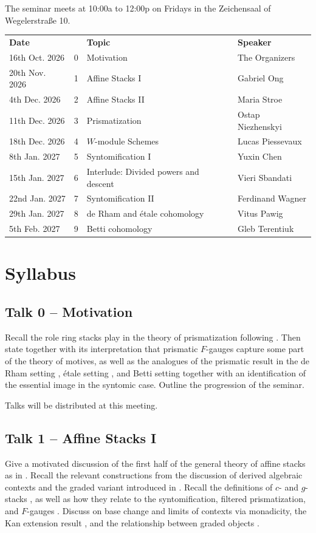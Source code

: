 \documentclass[12pt]{amsart}
\theoremstyle{definition}
\begin{document}
The seminar meets at 10:00a to 12:00p on Fridays in the Zeichensaal of Wegelerstraße 10.  
\begin{table}[H]
    \centering
    \begin{tabular}{lrll}
        \textbf{Date}  & & \textbf{Topic} & \textbf{Speaker}\\
        16th Oct. 2026 &0& Motivation &  The Organizers\\
        20th Nov. 2026 &1& Affine Stacks I &  Gabriel Ong\\
        4th Dec. 2026 &2& Affine Stacks II &  Maria Stroe\\
        11th Dec. 2026 &3& Prismatization &  Ostap Niezhenskyi\\
        18th Dec. 2026 &4& $W$-module Schemes &  Lucas Piessevaux\\
        8th Jan. 2027 &5& Syntomification I &  Yuxin Chen\\
        15th Jan. 2027 &6& Interlude: Divided powers and descent &  Vieri Sbandati\\
        22nd Jan. 2027 &7& Syntomification II &  Ferdinand Wagner\\
        29th Jan. 2027 &8& de Rham and \'{e}tale cohomology &  Vitus Pawig\\
        5th Feb. 2027 &9& Betti cohomology & Gleb Terentiuk
    \end{tabular}
\end{table}
\section*{Syllabus}
\subsection*{Talk 0 -- Motivation}
Recall the role ring stacks play in the theory of prismatization following \cite[\S 1.4]{Bha22}. Then state \cite[Thm. 1.7.4]{LM25} together with its interpretation that prismatic $F$-gauges capture some part of the theory of motives, as well as the analogues of the prismatic result in the de Rham setting \cite[Cor. 2.12]{LM25}, \'{e}tale setting \cite[Thm. 3.3]{LM25}, and Betti setting \cite[Thm. 4.11]{LM25} together with an identification of the essential image in the syntomic case. Outline the progression of the seminar. 

Talks will be distributed at this meeting. 
\subsection*{Talk 1 -- Affine Stacks I} 
Give a motivated discussion of the first half of the general theory of affine stacks as in \cite[App. B.1-6]{LM25}. Recall the relevant constructions from the discussion of derived algebraic contexts \cite[\S 4.2]{Rak20} and the graded variant introduced in \cite[Const. 4.3.4]{Rak20}. Recall the definitions of $c$- and $g$-stacks \cite[\S 2.1-2]{Dri22}, as well as how they relate to the syntomification, filtered prismatization, and $F$-gauges \cite[\S 1.6-8]{Dri22}. Discuss \cite[Lem. B.2-3]{LM25} on base change and limits of contexts via monadicity, the Kan extension result \cite[Def. B.4]{LM25}, and the relationship between graded objects \cite[Rmk. B.5-6]{LM25}. 
\end{document}
